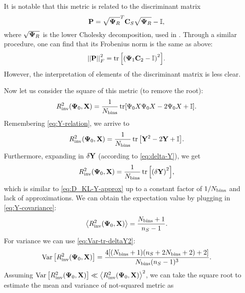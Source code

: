 It is notable that this metric is related to the discriminant matrix
\begin{equation} \label{eq:discriminant_matrix}
{\bf P} = \sqrt{{\bf \Psi}_R}^T {\bf C}_S \sqrt{{\bf \Psi}_R} - {\bf \mathbb{I}},
\end{equation}
where $\sqrt{{\bf \Psi}_R}$ is the lower Cholesky decomposition, used in \cite{rascalC,rascalC-legendre-3}.
Through a similar procedure, one can find that its Frobenius norm is the same as above:
\begin{equation}
\Abs{\Abs{\mathbf P}}_F^2 = \tr \Args{\Arg{{\bf \Psi}_1 {\bf C}_2 - {\bf \mathbb I}}^2}.
\end{equation}
However, the interpretation of elements of the discriminant matrix is less clear.

Now let us consider the square of this metric (to remove the root):
\begin{equation}
R_{\rm inv}^2 {\left( {\bf \Psi}_0, {\bf X} \right)} = \frac1{N_{\rm bins}} \tr [\Psi_0 X \Psi_0 X - 2 \Psi_0 X + \mathbb I].
\end{equation}
Remembering \cref{eq:Y-relation}, we arrive to
\begin{equation}
R_{\rm inv}^2 \Arg{{\bf \Psi}_0, {\bf X}} = \frac1{N_{\rm bins}} \tr \Args{{\bf Y}^2 - 2 {\bf Y} + {\bf \mathbb I}}.
\end{equation}
Furthermore, expanding in $\bf \delta Y$ (according to \cref{eq:delta-Y}), we get
\begin{equation} \label{eq:R_inv2-delta_Y}
R_{\rm inv}^2 \Arg{{\bf \Psi}_0, {\bf X}} = \frac1{N_{\rm bins}} \tr \Args{\Arg{\bf \delta Y}^2},
\end{equation}
which is similar to \cref{eq:D_KL-Y-approx} up to a constant factor of $1/N_{\rm bins}$ and lack of approximations.
We can obtain the expectation value by plugging in \cref{eq:Y-covariance}:
\begin{equation} \label{eq:R_inv2-expectation}
{\left\langle R_{\rm inv}^2 {\left( {\bf \Psi}_0, {\bf X} \right)} \right\rangle} = \frac{N_{\rm bins}+1}{n_S-1}.
\end{equation}
For variance we can use \cref{eq:Var-tr-deltaY2}:
\begin{equation} \label{eq:R_inv2-variance}
\operatorname{Var} {\left[ R_{\rm inv}^2 {\left( {\bf \Psi}_0, {\bf X} \right)} \right]} = \frac{4 [(N_{\rm bins} + 1) (n_S + 2 N_{\rm bins} + 2) + 2]}{N_{\rm bins} (n_S-1)^3}.
\end{equation}
Assuming $\operatorname{Var} {\left[ R_{\rm inv}^2 {\left( {\bf \Psi}_0, {\bf X} \right)} \right]} \ll {\left\langle R_{\rm inv}^2 {\left( {\bf \Psi}_0, {\bf X} \right)} \right\rangle}^2$, we can take the square root to estimate the mean and variance of not-squared metric as
